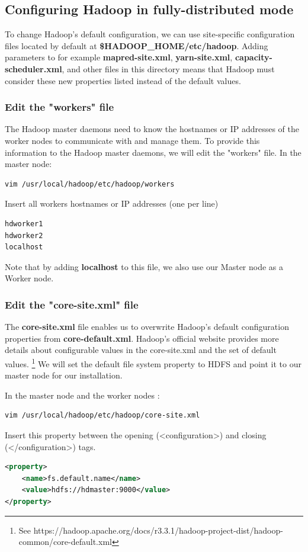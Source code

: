 \documentclass[12pt,english]{book}
\begin{document}
\subsection{Configuring Hadoop in fully-distributed mode}

To change Hadoop's default configuration, we can use site-specific configuration files located by default at \textbf{\$HADOOP\_HOME/etc/hadoop}.
Adding parameters to for example \textbf{mapred-site.xml}, \textbf{yarn-site.xml}, \textbf{capacity-scheduler.xml}, and other files in this directory means that Hadoop must consider these new properties listed instead of the default values.

\subsubsection{Edit the "workers" file}


The Hadoop master daemons need to know the hostnames or IP addresses of the worker nodes to communicate with and manage them. To provide this information to the Hadoop master daemons, we will edit the "workers" file.
In the master node:
\begin{lstlisting}[language=bash, frame=single, basicstyle=\footnotesize]
vim /usr/local/hadoop/etc/hadoop/workers
\end{lstlisting}
Insert all workers hostnames or IP addresses (one per line)
\begin{lstlisting}[language=bash, frame=single, basicstyle=\footnotesize]
hdworker1
hdworker2
localhost
\end{lstlisting}
Note that by adding \textbf{localhost} to this file, we also use our Master node as a Worker node. 


\subsubsection{Edit the "core-site.xml" file}


The \textbf{core-site.xml} file enables us to overwrite Hadoop's default configuration properties from \textbf{core-default.xml}.
Hadoop's official website provides more details about configurable values in the core-site.xml and the set of default values.
\footnote{See https://hadoop.apache.org/docs/r3.3.1/hadoop-project-dist/hadoop-common/core-default.xml}
We will set the default file system property to HDFS and point it to our master node for our installation.

In the master node and the worker nodes :
\begin{lstlisting}[language=bash, frame=single, basicstyle=\footnotesize]
vim /usr/local/hadoop/etc/hadoop/core-site.xml
\end{lstlisting}
Insert this property between the opening (<configuration>) and closing (</configuration>) tags. 
\begin{lstlisting}[language=xml, frame=single, basicstyle=\footnotesize]
<property>
	<name>fs.default.name</name>
	<value>hdfs://hdmaster:9000</value>
</property>
\end{lstlisting}
\end{document}
